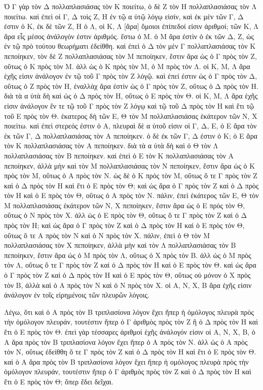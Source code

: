 \begin{Parallel}{}{}
{{\greekfont Ὁ Γ γὰρ τὸν Δ πολλαπλασιάσας τὸν Κ ποιείτω, ὁ δὲ Ζ τὸν Η
πολλαπλασιάσας τὸν Λ ποιείτω. καὶ  ἐπεὶ οἱ Γ, Δ τοὶς Ζ, Η ἐν τῷ α ὐτῷ λόγῳ εἰσίν, καὶ ἐκ μὲν τῶν Γ, Δ ἐστιν ὁ Κ, ἐκ δὲ τῶν
Ζ, Η ὁ Λ, οἱ Κ, Λ [ἄρα] ὅμοιοι ἐπίπεδοί εἰσιν ἀριθμοί; τῶν Κ,
Λ ἄρα εἷς μέσος ἀνάλογόν ἐστιν ἀριθμός. ἔστω ὁ Μ.
ὁ Μ ἄρα ἐστὶν ὁ ἐκ τῶν Δ, Ζ, ὡς ἐν τῷ πρὸ τούτου
θεωρήματι ἐδείθθη. καὶ ἐπεὶ ὁ Δ τὸν μὲν Γ πολλαπλασιάσας τὸν Κ
πεποίηκεν, τὸν δὲ Ζ πολλαπλασιάσας τὸν Μ πεποίηκεν, ἔστιν
ἄρα ὡς ὁ Γ πρὸς τὸν Ζ, οὕτως ὁ Κ πρὸς τὸν Μ. ἀλλ ὡς
ὁ Κ πρὸς τὸν Μ, ὁ Μ πρὸς τὸν Λ. οἱ Κ, Μ, Λ ἄρα ἑχῆς εἰσιν ἀνάλογον ἐν τῷ τοῦ Γ πρὸς τὸν Ζ λόγῷ. καὶ ἐπεί ἐστιν ὡς
ὁ Γ πρὸς τὸν Δ, οὕτως ὁ Ζ πρὸς τὸν Η, ἐναλλὰχ ἄρα ἐστὶν ὡς ὁ
Γ πρὸς τὸν Ζ, οὕτως ὁ Δ πρὸς τὸν Η.
διὰ τὰ α ὐτὰ δὴ καὶ ὡς ὁ Δ πρὸς τὸν Η,
οὕτως ὁ Ε πρὸς τὸν Θ.
οἱ Κ, Μ, Λ ἄρα ἑχῆς εἰσιν ἀνάλογον ἔν τε τῷ τοῦ Γ πρὸς
τὸν Ζ λόγῳ καὶ τῷ τοῦ Δ πρὸς τὸν Η καὶ ἔτι τῷ τοῦ Ε
πρὸς τὸν Θ. ἑκατερος δὴ τῶν Ε, Θ τὸν Μ πολλαπλασιάσας
 ἑκάτερον τῶν Ν, Χ ποιείτω. καὶ ἐπεὶ στερεός ἐστιν ὁ Α,
πλευραὶ δὲ α ὐτοῦ εἰσιν οἱ Γ, Δ, Ε, ὁ Ε ἄρα τὸν ἐκ τῶν Γ, Δ
πολλαπλασιάσας τὸν Α πεποίηκεν. ὁ δὲ ἐκ τῶν Γ, Δ 
ἐστιν ὁ Κ; ὁ Ε ἄρα τὸν Κ
πολλαπλασιάσας τὸν Α
πεποίηκεν. διὰ τὰ α ὐτὰ δὴ καὶ ὁ Θ τὸν Λ 
πολλαπλασιάσας τὸν Β πεποίηκεν. καὶ ἐπεὶ ὁ
Ε τὸν Κ πολλαπλασιάσας τὸν Α πεποίηκεν,
 ἀλλὰ μὴν καὶ τὸν Μ πολλαπλασιάσας
τὸν Ν πεποίηκεν, ἔστιν ἄρα ὡς ὁ Κ πρὸς τὸν Μ, οὕτως
ὁ Α πρὸς τὸν Ν. ὡς δὲ ὁ Κ πρὸς τὸν Μ, οὕτως
ὅ τε Γ πρὸς τὸν Ζ καὶ ὁ Δ πρὸς τὸν Η  καὶ ἔτι ὁ Ε πρὸς τὸν Θ;
καὶ ὡς ἄρα ὁ  Γ
πρὸς τὸν Ζ καὶ ὁ Δ πρὸς τὸν Η καὶ ὁ Ε πρὸς
τὸν Θ, οὕτως ὁ Α πρὸς τὸν Ν. πάλιν, ἐπεὶ ἑκάτερος τῶν Ε, Θ
τὸν Μ πολλαπλασιάσας ἑκάτερον τῶν Ν, Χ πεποίηκεν, ἔστιν ἄρα ὡς ὁ Ε πρὸς τὸν Θ, οὕτως ὁ Ν πρὸς τὸν Χ. ἀλλ ὡς ὁ Ε πρὸς τὸν Θ, οὕτως ὅ τε Γ πρὸς τὸν Ζ καὶ ὁ Δ πρὸς τὸν  Η; καὶ ὡς
ἄρα ὁ Γ πρὸς τὸν Ζ καὶ ὁ Δ πρὸς τὸν Η καὶ ὁ Ε πρὸς τὸν Θ, οὕτως
ὅ τε Α πρὸς τὸν Ν καὶ ὁ Ν πρὸς τὸν Χ. πάλιν, ἐπεὶ ὁ Θ τὸν Μ
πολλαπλασιάσας τὸν Χ πεποίηκεν, ἀλλὰ μὴν καὶ τὸν Λ πολλαπλασιάσας
τὸν Β πεποίηκεν, ἔστιν ἄρα ὡς ὁ Μ πρὸς τὸν Λ, οὕτως
ὁ Χ πρὸς τὸν Β. ἀλλ ὡς ὁ Μ πρὸς τὸν Λ, οὕτως ὅ τε Γ πρὸς τὸν
Ζ καὶ ὁ Δ πρὸς τὸν Η καὶ ὁ Ε πρὸς τὸν Θ. καὶ ὡς ἄρα ὁ Γ πρὸς τὸν Ζ καὶ ὁ Δ πρὸς τὸν Η καὶ ὁ Ε πρὸς τὸν Θ, οὕτως οὐ
μόνον ὁ Χ πρὸς τὸν Β, ἀλλὰ καὶ ὁ Α πρὸς τὸν Ν καὶ  ὁ Ν πρὸς
τὸν Χ. οἱ Α, Ν, Χ, Β ἄρα ἑχῆς εἰσιν ἀνάλογον ἐν τοῖς
εἰρημένοις τῶν πλευρῶν λόγοις.}

{\greekfont Λέγω, ὅτι καὶ ὁ Α πρὸς τὸν Β τριπλασίονα λόγον ἔχει
ἤπερ ἡ ὁμόλογος πλευρὰ πρὸς τὴν ὁμόλογον πλευράν, τουτέστιν
ἤπερ ὁ Γ ἀριθμὸς πρὸς τὸν Ζ ἢ ὁ Δ πρὸς τὸν Η καὶ ἔτι
ὁ Ε πρὸς τὸν Θ. ἐπεὶ γὰρ τέσσαρες ἀριθμοὶ ἑχῆς ἀνάλογόν εἰσιν
οἱ Α, Ν, Χ, Β, ὁ Α ἄρα πρὸς τὸν Β τριπλασίονα λόγον ἔχει ἤπερ
ὁ Α πρὸς τὸν Ν. ἀλλ ὡς ὁ Α πρὸς τὸν Ν, οὕτως ἐδείθθη
ὅ τε Γ πρὸς τὸν Ζ καὶ ὁ Δ πρὸς τὸν Η καὶ ἔτι ὁ Ε πρὸς
τὸν Θ. καὶ ὁ Α ἄρα πρὸς τὸν  Β τριπλασίονα λόγον ἔχει ἤπερ
ἡ ομόλογος πλευρὰ πρὸς τὴν ὁμόλογον πλευράν, τουτέστιν
ἤπερ ὁ Γ ἀριθμὸς πρὸς τὸν Ζ καὶ ὁ Δ πρὸς τὸν Η καὶ ἔτι ὁ Ε πρὸς τὸν Θ;  ὅπερ ἔδει δεῖχαι.}}


\end{Parallel}
